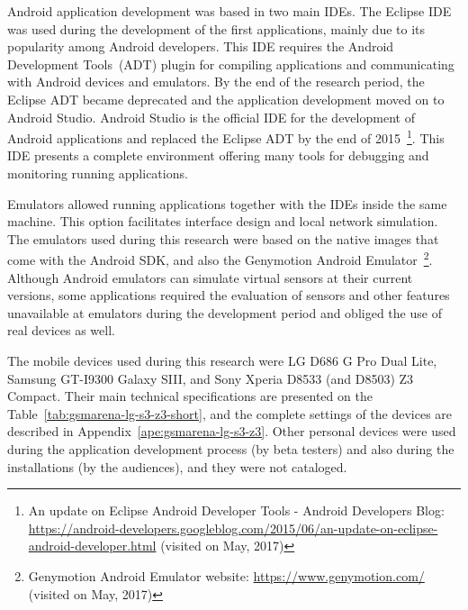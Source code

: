 
Android application development was based in two main IDEs.
The Eclipse IDE was used during the development of the first applications, mainly due to its popularity among Android developers.
This IDE requires the Android Development Tools~(ADT) plugin for compiling applications and communicating with Android devices and emulators.
By the end of the research period, the Eclipse ADT became deprecated and the application development moved on to Android Studio.
Android Studio is the official IDE for the development of Android applications and replaced the Eclipse ADT by the end of 2015~\footnote{An update on Eclipse Android Developer Tools - Android Developers Blog: \url{https://android-developers.googleblog.com/2015/06/an-update-on-eclipse-android-developer.html} (visited on May, 2017)}.
This IDE presents a complete environment offering many tools for debugging and monitoring running applications.

Emulators allowed running applications together with the IDEs inside the same machine.
This option facilitates interface design and local network simulation.
The emulators used during this research were based on the native images that come with the Android SDK, and also the Genymotion Android Emulator~\footnote{Genymotion Android Emulator website: \url{https://www.genymotion.com/} (visited on May, 2017)}.
Although Android emulators can simulate virtual sensors at their current versions, some applications required the evaluation of sensors and other features unavailable at emulators during the development period and obliged the use of real devices as well.

The mobile devices used during this research were LG D686 G Pro Dual Lite, Samsung GT-I9300 Galaxy SIII, and Sony Xperia D8533 (and D8503) Z3 Compact.
Their main technical specifications are presented on the Table~\ref{tab:gsmarena-lg-s3-z3-short}, and the complete settings of the devices are described in Appendix~\ref{ape:gsmarena-lg-s3-z3}.
Other personal devices were used during the application development process (by beta testers) and also during the installations (by the audiences), and they were not cataloged.

